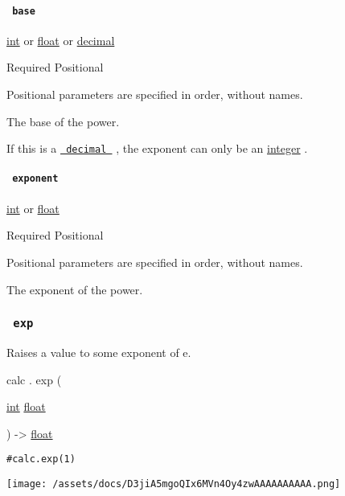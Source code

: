 \paragraph{\texorpdfstring{\texttt{\ base\ }}{ base }}\label{functions-pow-base}

\href{/docs/reference/foundations/int/}{int} {or}
\href{/docs/reference/foundations/float/}{float} {or}
\href{/docs/reference/foundations/decimal/}{decimal}

{Required} {{ Positional }}

\label{functions-pow-base-positional-tooltip}
Positional parameters are specified in order, without names.

The base of the power.

If this is a
\href{/docs/reference/foundations/decimal/}{\texttt{\ decimal\ }} , the
exponent can only be an \href{/docs/reference/foundations/int/}{integer}
.

\paragraph{\texorpdfstring{\texttt{\ exponent\ }}{ exponent }}\label{functions-pow-exponent}

\href{/docs/reference/foundations/int/}{int} {or}
\href{/docs/reference/foundations/float/}{float}

{Required} {{ Positional }}

\label{functions-pow-exponent-positional-tooltip}
Positional parameters are specified in order, without names.

The exponent of the power.

\subsubsection{\texorpdfstring{\texttt{\ exp\ }}{ exp }}\label{functions-exp}

Raises a value to some exponent of e.

calc { . } { exp } (

{ \href{/docs/reference/foundations/int/}{int}
\href{/docs/reference/foundations/float/}{float} }

) -\textgreater{} \href{/docs/reference/foundations/float/}{float}

\begin{verbatim}
#calc.exp(1)
\end{verbatim}

\texttt{[image: /assets/docs/D3jiA5mgoQIx6MVn4Oy4zwAAAAAAAAAA.png]}

